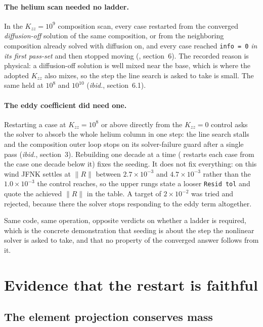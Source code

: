 \documentclass[english,a4paper]{my_memo}
\begin{document}
\paragraph{The helium scan needed no ladder.} In the $K_{zz} = 10^{9}$
composition scan, every case restarted from the converged
\emph{diffusion-off} solution of the same composition, or from the
neighboring composition already solved with diffusion on, and every case
reached \verb|info = 0| \emph{in its first pass-set} and then stopped moving
(, section~6). The recorded reason is
physical: a diffusion-off solution is well mixed near the base, which is
where the adopted $K_{zz}$ also mixes, so the step the line search is asked
to take is small. The same held at $10^{8}$ and $10^{10}$
(\emph{ibid.}, section~6.1).

\paragraph{The eddy coefficient did need one.} Restarting a case at
$K_{zz} = 10^{8}$ or above directly from the $K_{zz} = 0$ control asks the
solver to absorb the whole helium column in one step: the line search stalls
and the composition outer loop stops on its solver-failure guard after a
single pass (\emph{ibid.}, section~3). Rebuilding one decade at a time
( restarts each case from the case one decade below it)
fixes the seeding. It does not fix everything: on this wind JFNK settles
at $\|R\|$ between $2.7\times10^{-3}$ and $4.7\times10^{-3}$ rather than the
$1.0\times10^{-3}$ the control reaches, so the upper rungs state a looser
\verb|Resid tol| and quote the achieved $\|R\|$ in the table. A target of
$2\times10^{-2}$ was tried and rejected, because there the solver stops
responding to the eddy term altogether.

\medskip
\noindent Same code, same operation, opposite verdicts on whether a ladder
is required, which is the concrete demonstration that seeding is about
the step the nonlinear solver is asked to take, and that no property of the
converged answer follows from it.

\section{Evidence that the restart is faithful}
\label{sec:evidence}

\subsection{The element projection conserves mass}
\label{sec:projection-mass}
\end{document}
